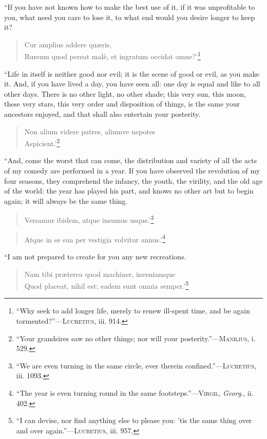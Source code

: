 \noindent ``If you have not known how to make the best use of it, if
it was unprofitable to you, what need you care to lose it, to
what end would you desire longer to keep it?

\begin{verse}
\vin {}Cur amplius addere qu\ae ris,\\
Rursum quod pereat mal\`e, et ingratum occidat omne?'\footnote{``Why
seek to add longer life, merely to renew ill-spent time, and be again
tormented?''---\textsc{Lucretius}, iii. 914.}
\end{verse}

\noindent ``Life in itself is neither good nor evil; it is the scene of
good or evil, as you make it. And, if you have lived a day, you have
seen all: one day is equal and like to all other days. There is no
other light, no other shade; this very sun, this moon, these very
stars, this very order and disposition of things, is the same your
ancestors enjoyed, and that shall also entertain your posterity.

\begin{verse}
Non alium videre patres, aliumve nepotes\\
Aspicient.'\footnote{``Your grandsires saw no other things; nor will
your posterity.''---\textsc{Manilius}, i. 529.}
\end{verse}

\noindent ``And, come the worst that can come, the distribution and
variety of all the acts of my comedy are performed in a year. If you
have observed the revolution of my four seasons, they comprehend the
infancy, the youth, the virility, and the old age of the world: the
year has played his part, and knows no other art but to begin again;
it will always be the same thing.

\begin{verse}
Versamur ibidem, atque insumus usque.'\footnote{``We are
even turning in the same circle, ever therein
confined.''---\textsc{Lucretius}, iii. 1093.}
\end{verse}

\begin{verse}
Atque in se sua per vestigia volvitur annus.'\footnote{``The
year is even turning round in the same footsteps.''---\textsc{Virgil},
\textit{Georg}., ii. 402.}
\end{verse}

``I am not prepared to create for you any new recreations.

\begin{verse}
Nam tibi pr\ae terea quod machiner, inveniamque\\ Quod
placeat, nihil est; eadem sunt omnia semper.'\footnote{``I can devise,
nor find anything else to please you: 'tis the same thing over and
over again.''---\textsc{Lucretius}, iii. 957.}
\end{verse}


